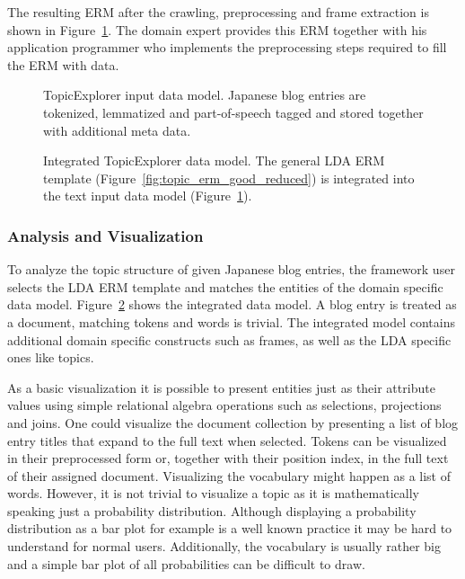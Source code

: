 The resulting ERM after the crawling, preprocessing and frame extraction is shown in Figure~\ref{fig:TopicExplorer_data_erm}. The domain expert provides this ERM together with his application programmer who implements the preprocessing steps required to fill the ERM with data.

\begin{figure}
\centering
\scalebox{\tikzScale}{\adjustTikzSize }
\caption[TopicExplorer input data model]{TopicExplorer input data model. Japanese blog entries are tokenized, lemmatized and part-of-speech tagged and stored together with additional meta data.}\label{fig:TopicExplorer_data_erm}
\end{figure}

\begin{figure}
\centering
\scalebox{0.7}{\adjustTikzSize }
\caption[Integrated TopicExplorer data model]{Integrated TopicExplorer data model. The general LDA ERM template (Figure~\ref{fig:topic_erm_good_reduced}) is integrated into the text input data model (Figure~\ref{fig:TopicExplorer_data_erm}).}\label{fig:TopicExplorer_integrated_erm}
\end{figure}

\subsubsection{Analysis and Visualization}
\label{subsec:casestudy_analysis}

To analyze the topic structure of given Japanese blog entries, the framework user selects the LDA ERM template and matches the entities of the domain specific data model. Figure~\ref{fig:TopicExplorer_integrated_erm} shows the integrated data model. A blog entry is treated as a document, matching tokens and words is trivial. The integrated model contains additional domain specific constructs such as frames, as well as the LDA specific ones like topics.

As a basic visualization it is possible to present entities just as their attribute values using simple relational algebra operations such as selections, projections and joins. One could visualize the document collection by presenting a list of blog entry titles that expand to the full text when selected. Tokens can be visualized in their preprocessed form or, together with their position index, in the full text of their assigned document. Visualizing the vocabulary might happen as a list of words. However, it is not trivial to visualize a topic as it is mathematically speaking just a probability distribution. Although displaying a probability distribution as a bar plot for example is a well known practice it may be hard to understand for normal users. Additionally, the vocabulary is usually rather big and a simple bar plot of all probabilities can be difficult to draw.

